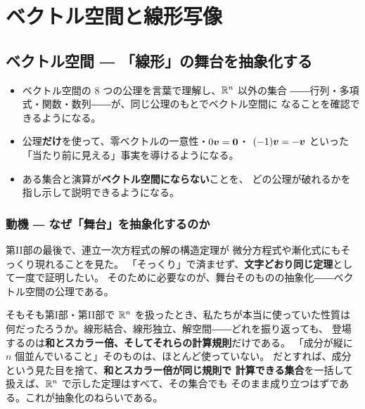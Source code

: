 \part{ベクトル空間と線形写像}

\chapter{ベクトル空間 ― 「線形」の舞台を抽象化する}\label{chap:vs}

\begin{goal}
\begin{itemize}
\item ベクトル空間の $8$ つの公理を言葉で理解し、$\mathbb{R}^n$ 以外の集合
――行列・多項式・関数・数列――が、同じ公理のもとでベクトル空間に
なることを確認できるようになる。
\item 公理\textbf{だけ}を使って、零ベクトルの一意性・$0\bm{v} = \bm{0}$・
$(-1)\bm{v} = -\bm{v}$ といった「当たり前に見える」事実を導けるようになる。
\item ある集合と演算が\textbf{ベクトル空間にならない}ことを、
どの公理が破れるかを指し示して説明できるようになる。
\end{itemize}
\end{goal}

\section{動機 ― なぜ「舞台」を抽象化するのか}

第II部の最後で、連立一次方程式の解の構造定理が
微分方程式や漸化式にもそっくり現れることを見た。
「そっくり」で済ませず、\textbf{文字どおり同じ定理}として一度で証明したい。
そのために必要なのが、舞台そのものの抽象化――ベクトル空間の公理である。

そもそも第I部・第II部で $\mathbb{R}^n$ を扱ったとき、私たちが本当に使っていた性質は
何だったろうか。線形結合、線形独立、解空間――どれを振り返っても、
登場するのは\textbf{和とスカラー倍、そしてそれらの計算規則}だけである。
「成分が縦に $n$ 個並んでいること」そのものは、ほとんど使っていない。
だとすれば、成分という見た目を捨て、\textbf{和とスカラー倍が同じ規則で
計算できる集合}を一括して扱えば、$\mathbb{R}^n$ で示した定理はすべて、その集合でも
そのまま成り立つはずである。これが抽象化のねらいである。

